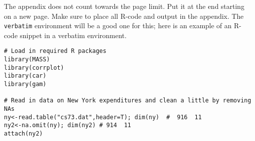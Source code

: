 \documentclass[11pt]{article}
\begin{document}
\clearpage
{}

\vspace{0.5cm}
The appendix does not count towards the page limit.  Put it at the end starting on a new page.  Make sure to place all R-code and output in the appendix.  The {\tt verbatim} environment will be a good one for this; here is an example of an R-code snippet in a verbatim environment.

\begin{verbatim}
# Load in required R packages
library(MASS)
library(corrplot)
library(car)
library(gam)

# Read in data on New York expenditures and clean a little by removing NAs
ny<-read.table("cs73.dat",header=T); dim(ny)  #  916  11
ny2<-na.omit(ny); dim(ny2) # 914  11
attach(ny2)
\end{verbatim}
\end{document}
